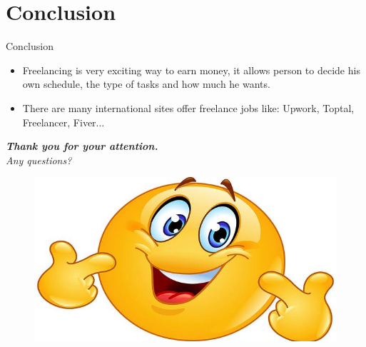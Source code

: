 \section*{Conclusion}
\begin{frame}{Conclusion}
  \begin{itemize}
     \item Freelancing is very exciting way to earn money, it allows person to decide his own schedule, the type of tasks and how much he wants.
    \item There are many international sites offer freelance jobs like: Upwork, Toptal, Freelancer, Fiver...
  \end{itemize}
\end{frame}
\begin{frame}
  \centering \Large
  \emph{
    \textbf{Thank you for your attention.}\\
    Any questions?
    }
    \vspace{0.4cm}
     \begin{figure}
        \includegraphics[scale=0.1]{figures/smile.jpg}
	\end{figure}
\end{frame}
